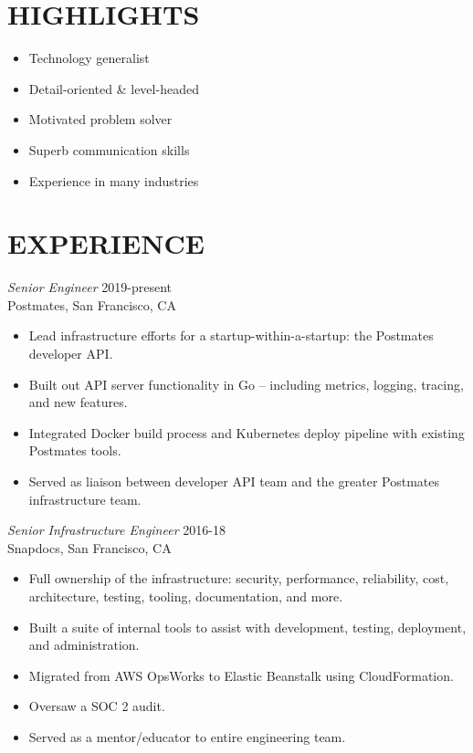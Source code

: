 \documentclass[line,margin]{res}
\begin{document}
\address{\,\,\,\,\,\,\,\,\,\,\,\,\,\,\,\,\,\,\,\,\, dana.merrick@gmail.com}
\address{\,\,\,\,\,\,\,\,\,\,\,\,\,\,\,\,\,\,\,\,USA-based -- 978.206.1331}

\begin{resume}

\section{HIGHLIGHTS}
  \begin{itemize}  \itemsep -2pt %
    \item Technology generalist
    \item Detail-oriented \& level-headed
    \item Motivated problem solver
    \item Superb communication skills
    \item Experience in many industries
  \end{itemize}
  
\section{EXPERIENCE}
  {\sl Senior Engineer}  \hfill 2019-present \\
  Postmates,
  San Francisco, CA
  \begin{itemize}  \itemsep -2pt %
    \item Lead infrastructure efforts for a startup-within-a-startup: the Postmates developer API.
    \item Built out API server functionality in Go -- including metrics, logging, tracing, and new features.
    \item Integrated Docker build process and Kubernetes deploy pipeline with existing Postmates tools.
    \item Served as liaison between developer API team and the greater Postmates infrastructure team.
  \end{itemize}

  {\sl Senior Infrastructure Engineer}  \hfill 2016-18 \\
  Snapdocs,
  San Francisco, CA
  \begin{itemize}  \itemsep -2pt %
    \item Full ownership of the infrastructure: security, performance, reliability, cost, architecture, testing, tooling, documentation, and more.
    \item Built a suite of internal tools to assist with development, testing, deployment, and administration.
    \item Migrated from AWS OpsWorks to Elastic Beanstalk using CloudFormation.
    \item Oversaw a SOC 2 audit.
    \item Served as a mentor/educator to entire engineering team.
  \end{itemize}


\end{resume}
\end{document}
